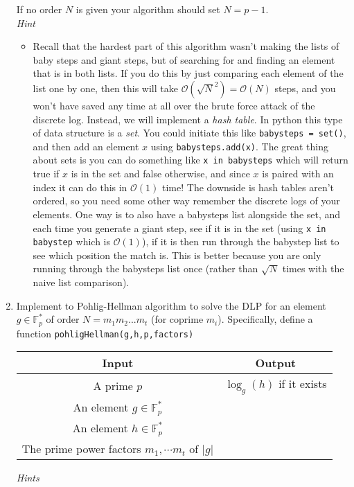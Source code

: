 \documentclass[11pt]{article}
\newcommand{\bF}{\mathbb{F}}
\newcommand{\cO}{\mathcal{O}}
\begin{document}
\begin{enumerate}
{\begin{center}
  \end{center}
  If no order $N$ is given your algorithm should set $N=p-1$.\\
  \textit{Hint}
  \begin{itemize}
    \item{
    Recall that the hardest part of this algorithm wasn't making the lists of baby steps and giant steps, but of searching for and finding an element that is in both lists.  If you do this by just comparing each element of the list one by one, then this will take $\cO(\sqrt N^2) = \cO(N)$ steps, and you won't have saved any time at all over the brute force attack of the discrete log.  Instead, we will implement a \textit{hash  table}.  In python this type of data structure is a \textit{set}.  You could initiate this like \verb|babysteps = set()|, and then add an element $x$ using \verb|babysteps.add(x)|.  The great thing about sets is you can do something like \verb|x in babysteps| which will return true if $x$ is in the set and false otherwise, and since $x$ is paired with an index it can do this in $\cO(1)$ time!  The downside is hash tables aren't ordered, so you need some other way remember the discrete logs of your elements.  One way is to also have a babysteps list alongside the set, and each time you generate a giant step, see if it is in the set (using \verb|x in babystep| which is $\cO(1)$), if it is then run through the babystep list to see which position the match is.  This is better because you are only running through the babysteps list once (rather than $\sqrt N$ times with the naive list comparison).
    }
  \end{itemize}
  }
  \item{
  Implement to Pohlig-Hellman algorithm to solve the DLP for an element $g\in\bF_p^*$ of order $N = m_1m_2...m_t$ (for coprime $m_i$).  Specifically, define a function \verb|pohligHellman(g,h,p,factors)|
  \begin{center}
    \begin{tabular}{c|c}
      Input & Output\\
      \hline
      A prime $p$ & $\log_g(h)$ if it exists\\
      An element $g\in\bF_p^*$ & \\
      An element $h\in\bF_p^*$ & \\
      The prime power factors $m_1,\cdots m_t$ of $|g|$ & \
    \end{tabular}
  \end{center}
  \textit{Hints}
  \begin{itemize}

\end{itemize}}
\end{enumerate}
\end{document}
